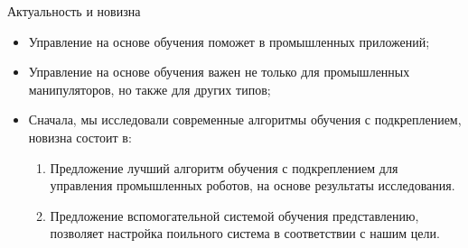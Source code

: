 \documentclass{beamer}
\begin{document}
\begin{frame}{Актуальность и новизна}
    \begin{itemize}
        \item <1-4> Управление на основе обучения поможет в промышленных приложений;
        \item <5-7> Управление на основе обучения важен не только для промышленных манипуляторов, но также для других типов;
        \item <8-10> Сначала, мы исследовали современные алгоритмы обучения с подкреплением, новизна состоит в:
        \begin{enumerate}
            \item <9> Предложение лучший алгоритм обучения с подкреплением для управления промышленных роботов, на основе результаты исследования.
            \item <10> Предложение вспомогательной системой обучения представлению, позволяет настройка поильного система в соответствии с нашим цели.
        \end{enumerate}
    \end{itemize}
\end{frame}
\end{document}
